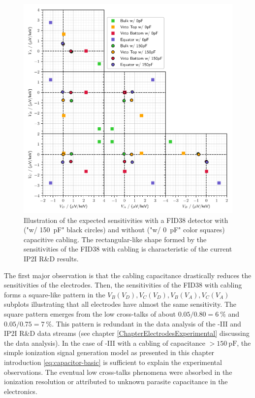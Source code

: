 \begin{figure}
\centering
\includegraphics[width=\linewidth]{Figures/Electrodes/pl38_predictive_sensitivity.pdf}
\caption{Illustration of the expected sensitivities with a FID38 detector with ("w/ \SI{150}{\pico\farad}" black circles) and without ("w/ \SI{0}{\pico\farad}" color squares) capacitive cabling. The rectangular-like shape formed by the sensitivities of the FID38 with cabling is characteristic of the current IP2I R\&D results.}
\label{fig:predict-corner-plot}
\end{figure}

The first major observation is that the cabling capacitance drastically reduces the sensitivities of the electrodes. Then, the sensitivities of the FID38 with cabling forms a square-like pattern in the $V_B(V_D), V_C(V_D), V_B(V_A), V_C(V_A)$ subplots illustrating that all electrodes have almost the same sensitivity.  The square pattern emerges from the low cross-talks of about $0.05/0.80=\SI{6}{\percent}$ and $0.05/0.75=\SI{7}{\percent}$. This pattern is redundant in the data analysis of the \Edelweiss{}-III and IP2I R\&D data streams (see chapter \ref{ChapterElectrodesExperimental} discussing the data analysis). 
In the case of \Edelweiss{}-III with a cabling of capacitance $>\SI{150}{\pico\farad}$, the simple ionization signal generation model as presented in this chapter introduction \ref{eq:capacitor-basic} is sufficient to explain the experimental observations. The eventual low cross-talks phenomena were absorbed in the ionization resolution or attributed to unknown parasite capacitance in the electronics.

